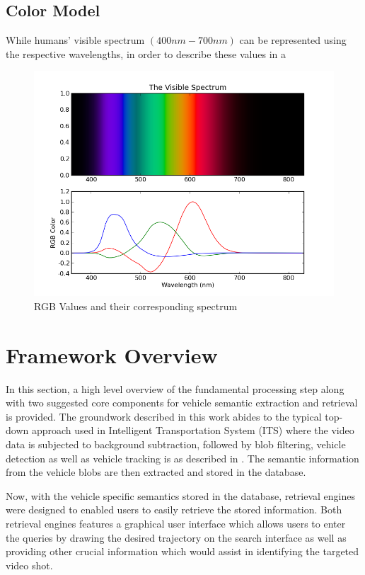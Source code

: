 \subsection{Color Model}

While humans' visible spectrum $(400nm - 700nm)$ can be represented using the respective wavelengths,  in order to describe these values in a 


\begin{figure}[hbt!]\centering
\includegraphics[width=.7\textwidth]{image/general/VisibleSpectrum.png}
\caption{RGB Values and their corresponding spectrum}
\label{fig:visibleSpectrum}
\end{figure}


\section{Framework Overview}
\label{section:framework}
In this section, a high level overview of the fundamental processing step along with two suggested core components for vehicle semantic extraction and retrieval is provided. The groundwork described in this work abides to the typical top-down approach used in Intelligent Transportation System (ITS) where the video data is subjected to background subtraction, followed by blob filtering, vehicle detection as well as vehicle tracking is as described in \cite{lim2017}. The semantic information from the vehicle blobs are then extracted and stored in the database. 

Now, with the vehicle specific semantics stored in the database, retrieval engines were designed to enabled users to easily retrieve the stored information. Both retrieval engines features a graphical user interface which allows users to enter the queries by drawing the desired trajectory on the search interface as well as providing other crucial information which would assist in identifying the targeted video shot.



